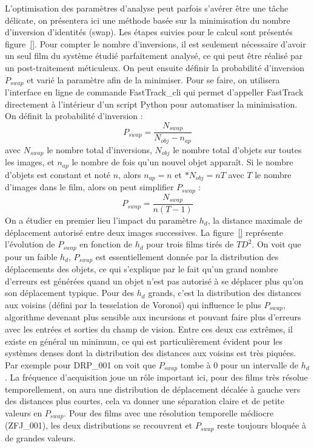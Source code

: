 	L'optimisation des paramètres d'analyse peut parfois s'avérer être une tâche délicate, on présentera ici une méthode basée sur la minimisation du nombre d'inversion d'identités (swap). Les étapes suivies pour le calcul sont présentés figure~\ref{}. Pour compter le nombre d'inversions, il est seulement nécessaire d'avoir un seul film du système étudié parfaitement analysé, ce qui peut être réalisé par un post-traitement méticuleux. On peut ensuite définir la probabilité d'inversion $P_{swap}$ et varié la paramètre afin de la minimiser. Pour se faire, on utilisera l'interface en ligne de commande FastTrack\_cli qui permet d'appeller FastTrack directement à l'intérieur d'un script Python pour automatiser la minimisation. On définit la probabilité d'inversion :
	$$
	    P_{swap}=\frac{N_{swap}}{N_{obj}-n_{ap}}
	$$
	avec $N_{swap}$ le nombre total d'inversions, $N_{obj}$ le nombre total d'objets sur toutes les images, et $n_{ap}$ le nombre de fois qu'un nouvel objet apparaît. Si le nombre d'objets est constant et noté $n$, alors $n_{ap}=n$ et $*N_{obj}=nT$ avec $T$ le nombre d'images dans le film, alors on peut simplifier $P_{swap}$ :
    $$
	    P_{swap}=\frac{N_{swap}}{n(T-1)}
	$$
	On a étudier en premier lieu l'impact du paramètre $h_d$, la distance maximale de déplacement autorisé entre deux images successives. La figure~\ref{} représente l'évolution de $P_{swap}$ en fonction de $h_d$ pour trois films tirés de $TD^2$. On voit que pour un faible $h_d$, $P_{swap}$ est essentiellement donnée par la distribution des déplacements des objets, ce qui s'explique par le fait qu'un grand nombre d'erreurs est générées quand un objet n'est pas autorisé à se déplacer plus qu'on son déplacement typique. Pour des $h_d$ grands, c'est la distribution des distances aux voisins (défini par la tesselation de Voronoï) qui influence le plus $P_{swap}$, algorithme devenant plus sensible aux incursions et pouvant faire plus d'erreurs avec les entrées et sorties du champ de vision.
	Entre ces deux cas extrêmes, il existe en général un minimum, ce qui est particulièrement évident pour les systèmes denses dont la distribution des distances aux voisins est très piquées. Par exemple pour DRP\_001 on voit que $P_{swap}$ tombe à 0 pour un intervalle de $h_d$. La fréquence d'acquisition joue un rôle important ici, pour des films très résolue temporellement, on aura une distribution de déplacement décalée à gauche vers des distances plus courtes, cela va donner une séparation claire et de petite valeurs en $P_{swap}$. Pour des films avec une résolution temporelle médiocre (ZFJ\_001), les deux distributions se recouvrent et $P_{swap}$ reste toujours bloquée à de grandes valeurs.\\
	
